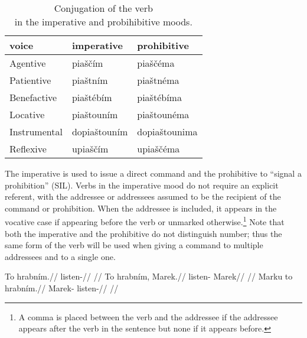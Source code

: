 \begin{table}[ht!]
\sffamily\footnotesize
	\caption{Conjugation of the verb \\ in the imperative and probihibitive moods.}
	\label{tbl:imperative}
\medskip
    \begin{tabu}to 0.7
         \toprule

         {\sc voice}&{\sc imperative}&{\sc prohibitive}  \\
         \midrule

         Agentive &
         {piaščím} &
         {piaščéma}\\

         Patientive &
         {piaštním} &
         {piaštnéma}\\

         Benefactive &
         {piaštébím} &
         {piaštébíma}\\

         Locative &
         {piaštouním} &
         {piaštounéma}\\

         Instrumental &
         {dopiaštouním} &
         {dopiaštounima}\\

         Reflexive &
         {upiaščím} &
         {upiaščéma}\\

         \bottomrule
    \end{tabu}

\end{table}

The imperative is used to issue a direct command and the prohibitive to ``signal a prohibition'' (SIL). Verbs in the imperative mood do not require an explicit referent, with the addressee or addressees assumed to be the recipient of the command or prohibition. When the addressee is included, it appears in the vocative case if appearing before the verb or unmarked otherwise.\footnote{A comma is placed between the verb and the addressee if the addressee appears after the verb in the sentence but none if it appears before.} Note that both the imperative and the prohibitive do not distinguish number; thus the same form of the verb will be used when giving a command to multiple addressees and to a single one.

\pex
\begingl
    \gla To hrabním.//
    \glb \Dem{} listen-//
    \glft {}//
\endgl
\xe
\pex
\a
\begingl
    \gla To hrabním, Marek.//
    \glb \Dem{} listen- Marek//
    \glft {}//
\endgl
\a
\begingl
    \gla Marku to hrabním.//
    \glb Marek- \Dem{} listen-//
    \glft {}//
\endgl
\xe

